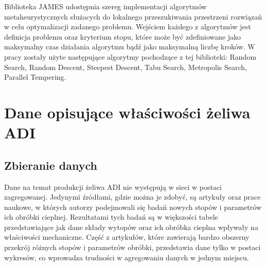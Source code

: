 Biblioteka JAMES udostępnia szereg implementacji algorytmów metaheurystycznych służacych do lokalnego przeszukiwania przestrzeni rozwiązań w celu optymalizacji zadanego problemu. Wejściem każdego z algorytmów jest definicja problemu oraz kryterium stopu, które może być zdefiniowane jako maksymalny czas działania algorytmu bądź jako maksymalną liczbę kroków. W pracy zostały użyte następujące algorytmy pochodzące z tej biblioteki: Random Search, Random Descent, Steepest Descent, Tabu Search, Metropolis Search, Parallel Tempering.

\section{Dane opisujące właściwości żeliwa ADI}
\subsection{Zbieranie danych}
Dane na temat produkcji żeliwa ADI nie występują w sieci w postaci zagregowanej. Jedynymi źródłami, gdzie można je zdobyć, są artykuły oraz prace naukowe, w których autorzy podejmowali się badań nowych stopów i parametrów ich obróbki cieplnej. Rezultatami tych badań są w większości tabele przedstawiające jak dane składy wytopów oraz ich obróbka cieplna wpływały na właściwości mechaniczne. Część z artykułów, które zawierają bardzo obszerny przekrój różnych stopów i parametrów obróbki, przedstawia dane tylko w postaci wykresów, co wprowadza trudności w agregowaniu danych w jednym miejscu.

